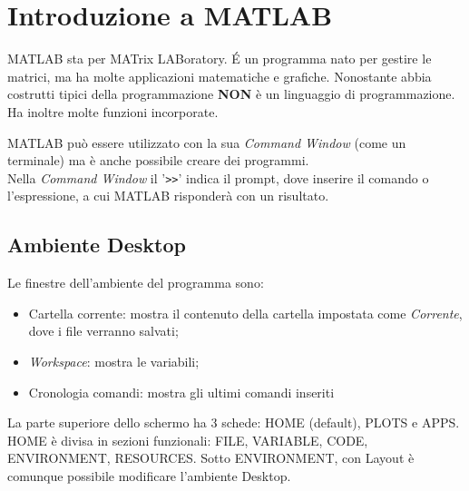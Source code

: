 \documentclass[a4paper, 10pt]{article}
\begin{document}
	
	\begin{frontespizio}
		\Preambolo{\usepackage{datetime}}
	\end{frontespizio}
	
	\newpage

	\tableofcontents
	\thispagestyle{empty}
		
	\newpage
	
	\section{Introduzione a MATLAB}
	MATLAB sta per MATrix LABoratory. \'{E} un programma nato per gestire le matrici, ma ha molte applicazioni matematiche e grafiche. Nonostante abbia costrutti tipici della programmazione \textbf{NON} è un linguaggio di programmazione. Ha inoltre molte funzioni incorporate.
	
	MATLAB può essere utilizzato con la sua \textit{Command Window} (come un terminale) ma è anche possibile creare dei programmi.\\
	Nella \textit{Command Window} il '\lstinline|>>|' indica il prompt, dove inserire il comando o l'espressione, a cui MATLAB risponderà con un risultato.
	
	\subsection{Ambiente Desktop}
	Le finestre dell'ambiente del programma sono:
	\begin{itemize}
	\item Cartella corrente: mostra il contenuto della cartella impostata come \textit{Corrente}, dove i file verranno salvati;
	\item \textit{Workspace}: mostra le variabili;
	\item Cronologia comandi: mostra gli ultimi comandi inseriti
	\end{itemize}
	La parte superiore dello schermo ha 3 schede: HOME (default), PLOTS e APPS.\\
	HOME è divisa in sezioni funzionali: FILE, VARIABLE, CODE, ENVIRONMENT, RESOURCES. Sotto ENVIRONMENT, con Layout è comunque possibile modificare l'ambiente Desktop.
	
\end{document}
